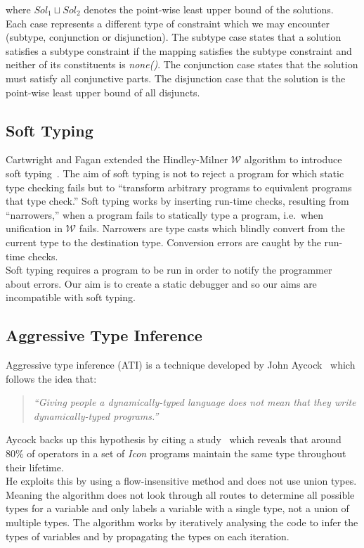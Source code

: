 \documentclass[12pt, titlepage]{article}
\begin{document}
where $Sol_1 \sqcup Sol_2$ denotes the point-wise least upper bound of the solutions. \\
Each case represents a different type of constraint which we may encounter (subtype, conjunction or disjunction). The subtype case states that a solution satisfies a subtype constraint if the mapping satisfies the subtype constraint and neither of its constituents is \textit{none()}. The conjunction case states that the solution must satisfy all conjunctive parts. The disjunction case that the solution is the point-wise least upper bound of all disjuncts.

\subsection{Soft Typing}
Cartwright and Fagan extended the Hindley-Milner $\mathcal{W}$ algorithm to introduce soft typing~\cite{cartwright91}. The aim of soft typing is not to reject a program for which static type checking fails but to ``transform arbitrary programs to equivalent programs that type check.'' Soft typing works by inserting run-time checks, resulting from ``narrowers,'' when a program fails to statically type a program, i.e.\ when unification in $\mathcal{W}$ fails. Narrowers are type casts which blindly convert from the current type to the destination type. Conversion errors are caught by the run-time checks. \\
Soft typing requires a program to be run in order to notify the programmer about errors. Our aim is to create a static debugger and so our aims are incompatible with soft typing.

\subsection{Aggressive Type Inference}
Aggressive type inference (ATI) is a technique developed by John Aycock~\cite{aggressiveType} which follows the idea that:
\begin{quote}
	\emph{``Giving people a dynamically-typed language does not mean that they write dynamically-typed programs.''}
\end{quote}
Aycock backs up this hypothesis by citing a study~\cite{typeInferenceIcon} which reveals that around 80\% of operators in a set of \textit{Icon} programs maintain the same type throughout their lifetime. \\
He exploits this by using a flow-insensitive method and does not use union types. Meaning the algorithm does not look through all routes to determine all possible types for a variable and only labels a variable with a single type, not a union of multiple types. The algorithm works by iteratively analysing the code to infer the types of variables and by propagating the types on each iteration.
\end{document}
